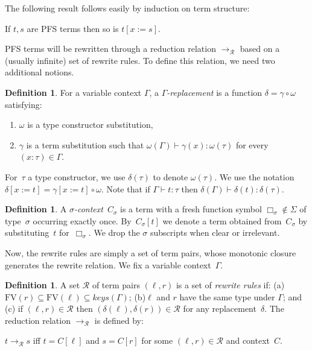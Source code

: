\documentclass[a4paper,UKenglish,cleveref,autoref,numberwithinsect]{lipics-v2019}
\theoremstyle{definition}
\newtheorem{defn}[theorem]{Definition}
\newcommand{\Rules}{\mathcal{R}}
\newcommand{\subst}[2]{#1:=#2}
\newcommand{\arr}[1]{\longrightarrow_{#1}}
\newcommand{\FV}{\mathrm{FV}}
\newcommand{\proves}{\vdash}
\begin{document}
The following result follows easily by induction on term
structure:

\begin{lemma}
  If $t,s$ are PFS terms then so is $t[\subst{x}{s}]$.
\end{lemma}

PFS terms will be rewritten through a reduction relation
$\arr{\Rules}$ based on a (usually infinite) set of rewrite rules. To
define this relation, we need two additional notions.

\begin{defn}\label{def_replacement}
  For a variable context $\Gamma$,
  a \emph{$\Gamma$-replacement} is a function $\delta = \gamma \circ
  \omega$ satisfying:
  \begin{enumerate}
  \item $\omega$ is a type constructor substitution,
  \item $\gamma$ is a term substitution such that $\omega(\Gamma)
    \proves \gamma(x) : \omega(\tau)$ for every $(x : \tau) \in
    \Gamma$.
  \end{enumerate}

  For~$\tau$ a type constructor, we use $\delta(\tau)$ to denote
  $\omega(\tau)$. We use the notation $\delta[\subst{x}{t}] =
  \gamma[\subst{x}{t}] \circ \omega$. Note that if $\Gamma \proves t :
  \tau$ then $\delta(\Gamma) \proves \delta(t) : \delta(\tau)$.
\end{defn}

\begin{defn}\label{def:context}
  A \emph{$\sigma$-context}~$C_\sigma$ is a term with a fresh function
  symbol $\Box_\sigma \notin \Sigma$ of type~$\sigma$ occurring
  exactly once. By~$C_\sigma[t]$ we denote a term obtained
  from~$C_\sigma$ by substituting~$t$ for~$\Box_\sigma$. We drop the
  $\sigma$ subscripts when clear or irrelevant.
\end{defn}

Now, the rewrite rules are simply a set of term pairs, whose
monotonic closure generates the rewrite relation. We fix a variable
context~$\Gamma$.

\begin{defn}\label{def_rules}
  A set $\Rules$ of term pairs $(\ell,r)$ is a set of \emph{rewrite
    rules} if: (a)
  $\FV(r) \subseteq \FV(\ell) \subseteq \mathit{keys}(\Gamma)$;
  (b)$\ell$ and $r$ have the same type under $\Gamma$; and (c) if
  $(\ell,r) \in \Rules$ then $(\delta(\ell),\delta(r)) \in \Rules$ for
  any replacement~$\delta$.
  The reduction relation $\arr{\Rules}$ is defined by:
  
\begin{center}
  $t \arr{\Rules}
  s$ iff $t = C[\ell]$ and $s = C[r]$ for some $(\ell,r)\in\Rules$ and
  context~$C$.
\end{center}
\end{defn}
\end{document}
